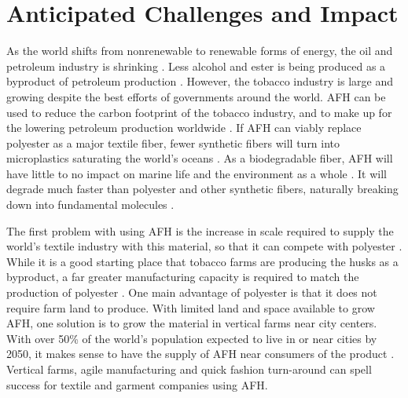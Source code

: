 \documentclass{article}
\begin{document}
\section{Anticipated Challenges and Impact}

As the world shifts from nonrenewable to renewable forms of energy, the oil and petroleum industry is shrinking \autocite{iucn}. Less alcohol and ester is being produced as a byproduct of petroleum production \autocite{iucn}\autocite{craftechindustries}. However, the tobacco industry is large and growing despite the best efforts of governments around the world. AFH can be used to reduce the carbon footprint of the tobacco industry, and to make up for the lowering petroleum production worldwide \autocite{afhfiber}. If AFH can viably replace polyester as a major textile fiber, fewer synthetic fibers will turn into microplastics saturating the world's oceans \autocite{microplasticrelease}\autocite{gesamp}. As a biodegradable fiber, AFH will have little to no impact on marine life and the environment as a whole \autocite{gesamp}\autocite{afhfiber}. It will degrade much faster than polyester and other synthetic fibers, naturally breaking down into fundamental molecules \autocite{naturalfiberprogressreport}.

The first problem with using AFH is the increase in scale required to supply the world's textile industry with this material, so that it can compete with polyester \autocite{afhfiber}. While it is a good starting place that tobacco farms are producing the husks as a byproduct, a far greater manufacturing capacity is required to match the production of polyester \autocite{afhfiber}. One main advantage of polyester is that it does not require farm land to produce. With limited land and space available to grow AFH, one solution is to grow the material in vertical farms near city centers. With over 50\% of the world's population expected to live in or near cities by 2050, it makes sense to have the supply of AFH near consumers of the product \autocite{globaltradeanalysis}. Vertical farms, agile manufacturing and quick fashion turn-around can spell success for textile and garment companies using AFH.
\end{document}
